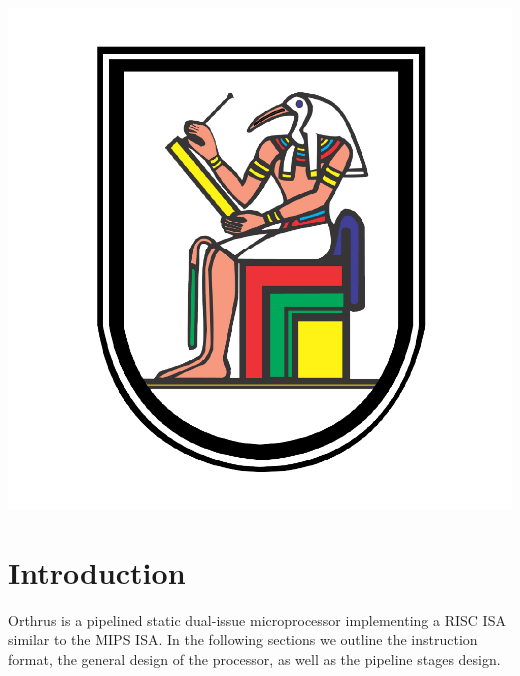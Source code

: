 \documentclass[12pt]{article}
\theoremstyle{plain}
\theoremstyle{definition}
\begin{document}
\begin{titlepage}
	
	
	\includegraphics[scale=0.15]{cu_logo.png}\\[1cm] %
	 
	
	\vfill %
	
\end{titlepage}

\tableofcontents

\section{Introduction}
Orthrus is a pipelined static dual-issue microprocessor implementing a RISC ISA similar to the MIPS ISA. In the following sections we outline the instruction format, the general design of the processor, as well as the pipeline stages design.
\end{document}
